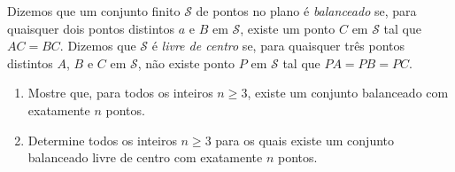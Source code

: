 Dizemos que um conjunto finito $\mathcal{S}$ de pontos no plano é \textit{balanceado} se, para quaisquer dois pontos distintos $a$ e $B$ em $\mathcal{S}$, existe um ponto $C$ em $\mathcal{S}$ tal que $AC = BC$. Dizemos que $\mathcal{S}$ é \textit{livre de centro} se, para quaisquer três pontos distintos $A$, $B$ e $C$ em $\mathcal{S}$, não existe ponto $P$ em $\mathcal{S}$ tal que $PA=PB=PC$.

\begin{enumerate}[label = (\alph*)]
	\item Mostre que, para todos os inteiros $n\ge 3$, existe um conjunto balanceado com exatamente $n$ pontos.
	\item Determine todos os inteiros $n\ge 3$ para os quais existe um conjunto balanceado livre de centro com exatamente $n$ pontos.
\end{enumerate}
